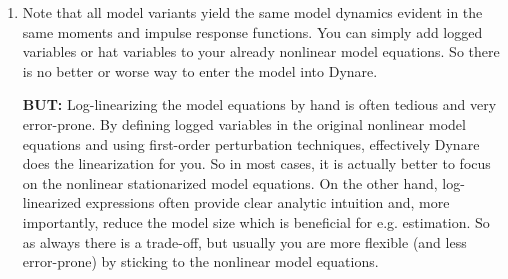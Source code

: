 \begin{enumerate}
\item Note that all model variants yield the same model dynamics evident in the same moments and impulse response functions.
You can simply add logged variables or hat variables to your already nonlinear model equations.
So there is no better or worse way to enter the model into Dynare.

\textbf{BUT:} Log-linearizing the model equations by hand is often tedious and very error-prone.
By defining logged variables in the original nonlinear model equations and using first-order perturbation techniques,
  effectively Dynare does the linearization for you.
So in most cases, it is actually better to focus on the nonlinear stationarized model equations.
On the other hand, log-linearized expressions often provide clear analytic intuition
  and, more importantly, reduce the model size which is beneficial for e.g. estimation.
So as always there is a trade-off, but usually you are more flexible (and less error-prone) by sticking to the nonlinear model equations.

\end{enumerate}